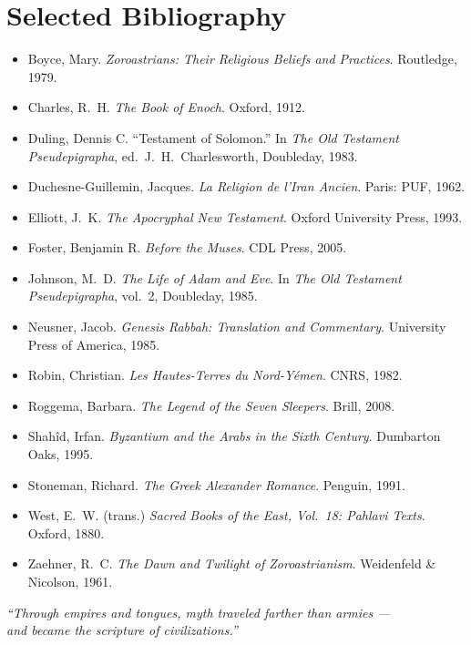 \documentclass[11pt,a4paper]{article}
\begin{document}
\section*{Selected Bibliography}
\begin{itemize}[leftmargin=1.2cm]
  \item Boyce, Mary. \emph{Zoroastrians: Their Religious Beliefs and Practices}. Routledge, 1979.
  \item Charles, R.\ H. \emph{The Book of Enoch}. Oxford, 1912.
  \item Duling, Dennis C. “Testament of Solomon.” In \emph{The Old Testament Pseudepigrapha}, ed.\ J.\ H.\ Charlesworth, Doubleday, 1983.
  \item Duchesne-Guillemin, Jacques. \emph{La Religion de l’Iran Ancien}. Paris: PUF, 1962.
  \item Elliott, J.\ K. \emph{The Apocryphal New Testament}. Oxford University Press, 1993.
  \item Foster, Benjamin R. \emph{Before the Muses}. CDL Press, 2005.
  \item Johnson, M.\ D. \emph{The Life of Adam and Eve}. In \emph{The Old Testament Pseudepigrapha}, vol.\ 2, Doubleday, 1985.
  \item Neusner, Jacob. \emph{Genesis Rabbah: Translation and Commentary}. University Press of America, 1985.
  \item Robin, Christian. \emph{Les Hautes-Terres du Nord-Yémen}. CNRS, 1982.
  \item Roggema, Barbara. \emph{The Legend of the Seven Sleepers}. Brill, 2008.
  \item Shahîd, Irfan. \emph{Byzantium and the Arabs in the Sixth Century}. Dumbarton Oaks, 1995.
  \item Stoneman, Richard. \emph{The Greek Alexander Romance}. Penguin, 1991.
  \item West, E.\ W. (trans.) \emph{Sacred Books of the East, Vol.\ 18: Pahlavi Texts}. Oxford, 1880.
  \item Zaehner, R.\ C. \emph{The Dawn and Twilight of Zoroastrianism}. Weidenfeld \& Nicolson, 1961.
\end{itemize}

\vfill
\begin{center}
\textit{“Through empires and tongues, myth traveled farther than armies —\\
and became the scripture of civilizations.”}
\end{center}
\end{document}
